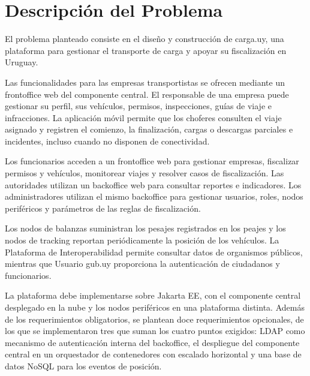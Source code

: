 \section{Descripción del Problema}

El problema planteado consiste en el diseño y construcción de carga.uy, una plataforma para gestionar el transporte de carga y apoyar su fiscalización en Uruguay.

Las funcionalidades para las empresas transportistas se ofrecen mediante un frontoffice web del componente central. El responsable de una empresa puede gestionar su perfil, sus vehículos, permisos, inspecciones, guías de viaje e infracciones. La aplicación móvil permite que los choferes consulten el viaje asignado y registren el comienzo, la finalización, cargas o descargas parciales e incidentes, incluso cuando no disponen de conectividad.

Los funcionarios acceden a un frontoffice web para gestionar empresas, fiscalizar permisos y vehículos, monitorear viajes y resolver casos de fiscalización. Las autoridades utilizan un backoffice web para consultar reportes e indicadores. Los administradores utilizan el mismo backoffice para gestionar usuarios, roles, nodos periféricos y parámetros de las reglas de fiscalización.

Los nodos de balanzas suministran los pesajes registrados en los peajes y los nodos de tracking reportan periódicamente la posición de los vehículos. La Plataforma de Interoperabilidad permite consultar datos de organismos públicos, mientras que Usuario gub.uy proporciona la autenticación de ciudadanos y funcionarios.

La plataforma debe implementarse sobre Jakarta EE, con el componente central desplegado en la nube y los nodos periféricos en una plataforma distinta. Además de los requerimientos obligatorios, se plantean doce requerimientos opcionales, de los que se implementaron tres que suman los cuatro puntos exigidos: LDAP como mecanismo de autenticación interna del backoffice, el despliegue del componente central en un orquestador de contenedores con escalado horizontal y una base de datos NoSQL para los eventos de posición.
